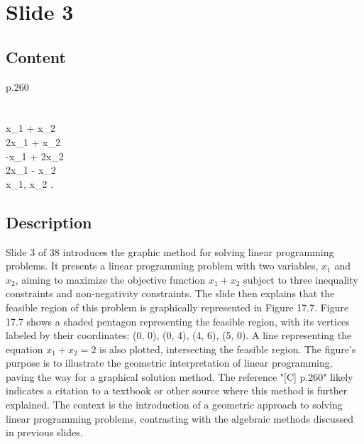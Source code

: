 \documentclass{article}%
\begin{document}
%
\newpage%
\section{Slide 3}%
\label{sec:Slide3}%
\subsection{Content}%

 \quad [C] \quad p.260 \\
 \\
 \\
 \quad x_1 + x_2 \\
 \quad 2x_1 + x_2  \\
\quad \quad -x_1 + 2x_2  \\
\quad \quad 2x_1 - x_2  \\
\quad \quad x_1, x_2 . \\
%
\subsection{Description}%
Slide 3 of 38 introduces the graphic method for solving linear programming problems.  It presents a linear programming problem with two variables, $x_1$ and $x_2$, aiming to maximize the objective function $x_1 + x_2$ subject to three inequality constraints and non-negativity constraints. The slide then explains that the feasible region of this problem is graphically represented in Figure 17.7.  Figure 17.7 shows a shaded pentagon representing the feasible region, with its vertices labeled by their coordinates: (0, 0), (0, 4), (4, 6), (5, 0).  A line representing the equation $x_1 + x_2 = 2$ is also plotted, intersecting the feasible region. The figure's purpose is to illustrate the geometric interpretation of linear programming, paving the way for a graphical solution method. The reference "[C] p.260" likely indicates a citation to a textbook or other source where this method is further explained. The context is the introduction of a geometric approach to solving linear programming problems, contrasting with the algebraic methods discussed in previous slides.%
\end{document}
